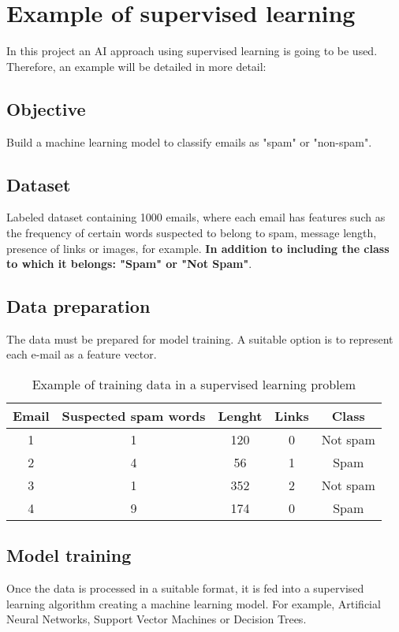 \section{Example of supervised learning}

In this project an AI approach using supervised learning is going to be used. Therefore, an example will be detailed in more detail:

\subsection{Objective}
Build a machine learning model to classify emails as "spam" or "non-spam".

\subsection{Dataset}
Labeled dataset containing 1000 emails, where each email has features such as the frequency of certain words suspected to belong to spam, message length, presence of links or images, for example. \textbf{In addition to including the class to which it belongs: "Spam" or "Not Spam"}.

\subsection{Data preparation}
The data must be prepared for model training. 
A suitable option is to represent each e-mail as a feature vector.

\begin{table}[ht]
\centering
\begin{tabular}{|c|c|c|c|c|}
\hline
\textbf{Email} & \textbf{Suspected spam words} & \textbf{Lenght} & \textbf{Links} & \textbf{Class} \\ \hline
1 & 1 & 120 & 0 & Not spam \\
2 & 4 & 56 & 1 & Spam \\
3 & 1 & 352 & 2 & Not spam \\
4 & 9 & 174 & 0 & Spam \\
\hline
\end{tabular}
\caption{Example of training data in a supervised learning problem}
\end{table}

\subsection{Model training}
Once the data is processed in a suitable format, it is fed into a supervised learning algorithm creating a machine learning model. For example, Artificial Neural Networks, Support Vector Machines or Decision Trees.

